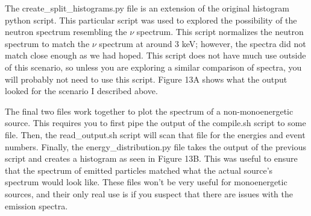 \documentclass[%
12pt,
twoside,
reprint,
amsmath,amssymb,
aps,
]{article}
\begin{document}
	\par The create\_split\_histograms.py file is an extension of the original histogram python script. This particular script was used to explored the possibility of the neutron spectrum resembling the $\nu$ spectrum. This script normalizes the neutron spectrum to match the $\nu$ spectrum at around 3 keV; however, the spectra did not match close enough as we had hoped. This script does not have much use outside of this scenario, so unless you are exploring a similar comparison of spectra, you will probably not need to use this script. Figure 13A shows what the output looked for the scenario I described above.
	\par The final two files work together to plot the spectrum of a non-monoenergetic source. This requires you to first pipe the output of the compile.sh script to some file. Then, the read\_output.sh script will scan that file for the energies and event numbers. Finally, the energy\_distribution.py file takes the output of the previous script and creates a histogram as seen in Figure 13B. This was useful to ensure that the spectrum of emitted particles matched what the actual source's spectrum would look like. These files won't be very useful for monoenergetic sources, and their only real use is if you suspect that there are issues with the emission spectra.
\end{document}
